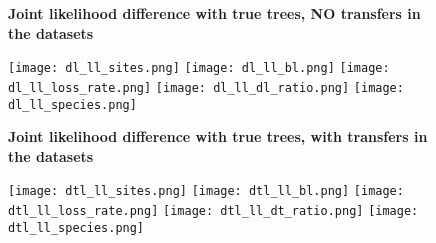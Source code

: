 \documentclass[12pt,a4paper]{article}
\begin{document}
\newcommand*{\figuretitle}[1]{%
    {\centering%
    \textbf{#1}%
    \par\medskip}%
}



\begin{figure}
\figuretitle{Joint likelihood difference with true trees, NO transfers in the datasets}
\texttt{[image: dl\_ll\_sites.png]}
\texttt{[image: dl\_ll\_bl.png]}
\texttt{[image: dl\_ll\_loss\_rate.png]}
\texttt{[image: dl\_ll\_dl\_ratio.png]}
\texttt{[image: dl\_ll\_species.png]}
\end{figure}


\begin{figure}
\figuretitle{Joint likelihood difference with true trees, with transfers in the datasets}
\texttt{[image: dtl\_ll\_sites.png]}
\texttt{[image: dtl\_ll\_bl.png]}
\texttt{[image: dtl\_ll\_loss\_rate.png]}
\texttt{[image: dtl\_ll\_dt\_ratio.png]}
\texttt{[image: dtl\_ll\_species.png]}
\end{figure}
\end{document}
